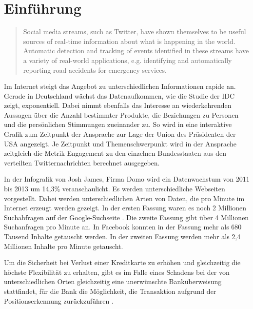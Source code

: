 \chapter{Einführung}

\begin{quote}
Social media streams, such as Twitter, have shown themselves to be useful sources of real-time information about what is happening in the world. Automatic detection and tracking of events identified in these streams have a variety of real-world applications, e.g. identifying and automatically reporting road accidents for emergency services.
\end{quote}

Im Internet steigt das Angebot zu unterschiedlichen Informationen rapide an. Gerade in Deutschland wächst das Datenaufkommen, wie die Studie der IDC  zeigt, exponentiell. Dabei nimmt ebenfalls das Interesse an wiederkehrenden Aussagen über die Anzahl bestimmter Produkte, die Beziehungen zu Personen und die persönlichen Stimmungen zueinander zu. So wird in  eine interaktive Grafik zum Zeitpunkt der Ansprache zur Lage der Union des Präsidenten der USA angezeigt. Je Zeitpunkt und Themenschwerpunkt wird in der Ansprache zeitgleich die Metrik Engagement zu den einzelnen Bundesstaaten aus den verteilten Twitternachrichten berechnet ausgegeben.
%
% 

In der Infografik  von Josh James, Firma Domo wird ein Datenwachstum von 2011 bis 2013 um 14,3\% veranschaulicht. Es werden unterschiedliche Webseiten vorgestellt. Dabei werden unterschiedlichen Arten von Daten, die pro Minute im Internet erzeugt werden gezeigt. 
In der ersten Fassung  waren es noch 2 Millionen Suchabfragen auf der Google-Suchseite . Die zweite Fassung gibt über 4 Millionen Suchanfragen pro Minute an. In Facebook  konnten in der Fassung mehr als 680 Tausend Inhalte getauscht werden. In der zweiten Fassung werden mehr als 2,4 Millionen Inhalte pro Minute getauscht. 

Um die Sicherheit bei Verlust einer Kreditkarte zu erhöhen und gleichzeitig die höchste Flexibilität zu erhalten, gibt es im Falle eines Schadens bei der von unterschiedlichen Orten gleichzeitig eine unerwünschte Banküberweisung stattfindet, für die Bank die Möglichkeit, die Transaktion aufgrund der Positionserkennung zurückzuführen .

